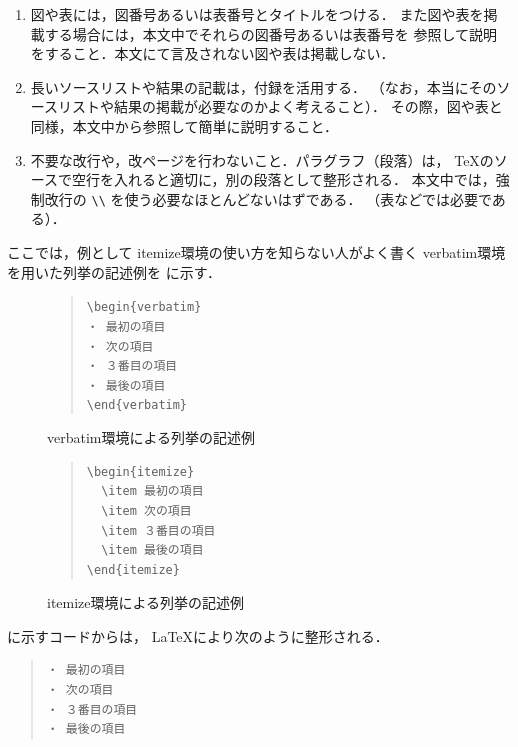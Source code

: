 \documentclass{jarticle}[11pt]
\newcommand{\figref}[1]{\makebox{図~\ref{#1}}}
\begin{document}
\begin{enumerate}
数式は，\LaTeX の数式モードを利用することで，
適切な数式用のフォントを使う．
このサンプルでは，適切なフォントを利用している．

\item 図や表には，図番号あるいは表番号とタイトルをつける．
また図や表を掲載する場合には，本文中でそれらの図番号あるいは表番号を
参照して説明をすること．本文にて言及されない図や表は掲載しない．

\item 長いソースリストや結果の記載は，付録を活用する．
（なお，本当にそのソースリストや結果の掲載が必要なのかよく考えること）．
その際，図や表と同様，本文中から参照して簡単に説明すること．

\item 不要な改行や，改ページを行わないこと．パラグラフ（段落）は，
TeXのソースで空行を入れると適切に，別の段落として整形される．
本文中では，強制改行の \verb|\\| を使う必要なほとんどないはずである．
（表などでは必要である）．

\end{enumerate}

ここでは，例として itemize環境の使い方を知らない人がよく書く
verbatim環境を用いた列挙の記述例を
\figref{fig:verbatim環境による列挙の記述例}に示す．
%
\begin{figure}[tb]
\begin{center}
\begin{quote}
\verb|\begin{verbatim}| \\
\verb|・ 最初の項目| \\
\verb|・ 次の項目| \\
\verb|・ ３番目の項目| \\
\verb|・ 最後の項目| \\
\verb|\end{verbatim}|
\end{quote}
\caption{verbatim環境による列挙の記述例}
\label{fig:verbatim環境による列挙の記述例}
\end{center}
\end{figure}
%
\begin{figure}[tb]
\begin{quote}
\begin{verbatim}
\begin{itemize}
  \item 最初の項目
  \item 次の項目
  \item ３番目の項目
  \item 最後の項目
\end{itemize}
\end{verbatim}
\end{quote}
\caption{itemize環境による列挙の記述例}
\label{fig:itemize環境による列挙の記述例}
\end{figure}
%
\figref{fig:verbatim環境による列挙の記述例}に示すコードからは，
\LaTeX により次のように整形される．
%
\begin{quote}
\begin{verbatim}
・ 最初の項目
・ 次の項目
・ ３番目の項目
・ 最後の項目
\end{verbatim}
\end{quote}
\end{document}
